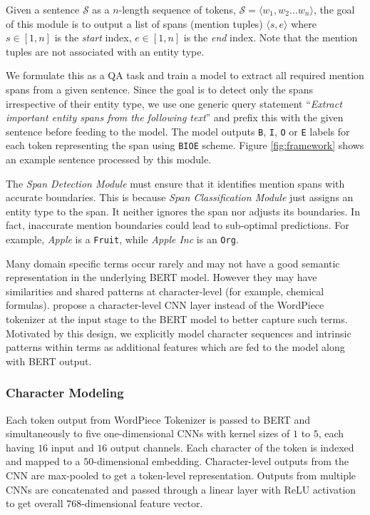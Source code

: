 Given a sentence $\mathcal{S}$ as a $n$-length sequence of tokens, $\mathcal{S} = \langle w_1, w_2 \ldots w_n \rangle$, the goal of this module is to output a list of spans (mention tuples) $\langle s, e\rangle$ where $s \in [1, n]$ is the \textit{start} index, $e \in [1, n]$ is the \textit{end} index. Note that the mention tuples are not associated with an entity type. 

We formulate this as a QA task and train a model to extract all required mention spans from a given sentence. Since the goal is to detect only the spans irrespective of their entity type, we use one generic query statement ``\textit{Extract important entity spans from the following text}'' and prefix this with the given sentence before feeding to the model. The model outputs \texttt{B}, \texttt{I}, \texttt{O} or \texttt{E} labels for each token representing the span using \texttt{BIOE} scheme. Figure \ref{fig:framework} shows an example sentence processed by this module.

The \textit{Span Detection Module} must ensure that it identifies mention spans with accurate boundaries. This is because \textit{Span Classification Module} just assigns an entity type to the span. It neither ignores the span nor adjusts its boundaries. In fact, inaccurate mention boundaries could lead to sub-optimal predictions. For example, \textit{Apple} is a \texttt{Fruit}, while \textit{Apple Inc} is an \texttt{Org}.

Many domain specific terms occur rarely and may not have a good semantic representation in the underlying BERT model. However they may have similarities and shared patterns at character-level (for example, chemical formulas). \cite{boukkouri2020characterbert} propose a character-level CNN layer instead of the WordPiece tokenizer at the input stage to the BERT model to better capture such terms. Motivated by this design, we explicitly model character sequences and intrinsic patterns within terms as additional features which are fed to the model along with BERT output.
 
\subsubsection{Character Modeling} Each token output from WordPiece Tokenizer is passed to BERT and simultaneously to five one-dimensional CNNs with kernel sizes of $1$ to $5$, each having $16$ input and $16$ output channels. Each character of the token is indexed and mapped to a $50$-dimensional embedding. Character-level outputs from the CNN are max-pooled to get a token-level representation. Outputs from multiple CNNs are concatenated and passed through a linear layer with ReLU activation to get overall $768$-dimensional feature vector.
    
